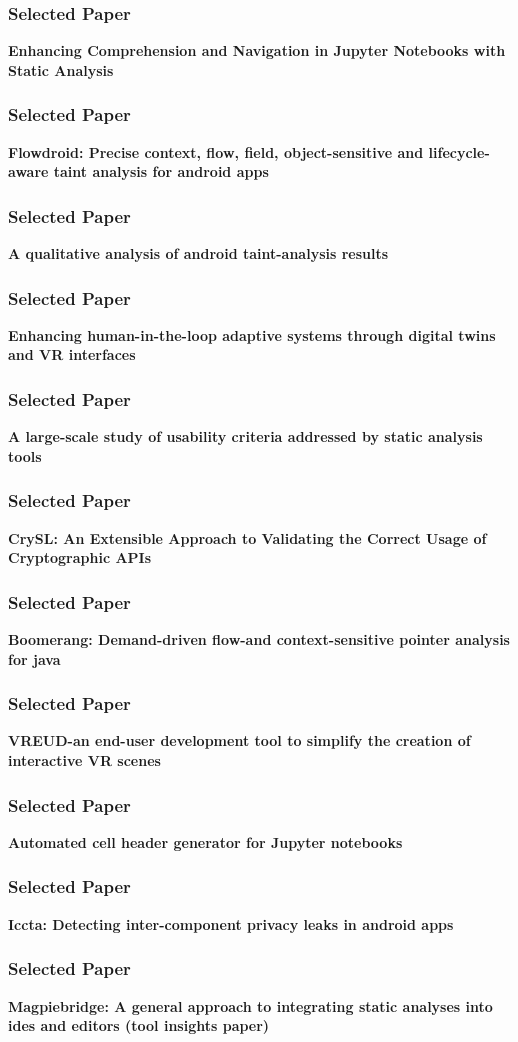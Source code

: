 \documentclass[handout]{beamer}
\begin{document}
\begin{frame}[plain]
\centering
\frametitle{Selected Paper}
\Large\textbf{Enhancing Comprehension and Navigation in Jupyter Notebooks with Static Analysis}
\end{frame}
\begin{frame}[plain]
\centering
\frametitle{Selected Paper}
\Large\textbf{Flowdroid: Precise context, flow, field, object-sensitive and lifecycle-aware taint analysis for android apps}
\end{frame}
\begin{frame}[plain]
\centering
\frametitle{Selected Paper}
\Large\textbf{A qualitative analysis of android taint-analysis results}
\end{frame}
\begin{frame}[plain]
\centering
\frametitle{Selected Paper}
\Large\textbf{Enhancing human-in-the-loop adaptive systems through digital twins and VR interfaces}
\end{frame}
\begin{frame}[plain]
\centering
\frametitle{Selected Paper}
\Large\textbf{A large-scale study of usability criteria addressed by static analysis tools}
\end{frame}
\begin{frame}[plain]
\centering
\frametitle{Selected Paper}
\Large\textbf{CrySL: An Extensible Approach to Validating the Correct Usage of Cryptographic APIs}
\end{frame}
\begin{frame}[plain]
\centering
\frametitle{Selected Paper}
\Large\textbf{Boomerang: Demand-driven flow-and context-sensitive pointer analysis for java}
\end{frame}
\begin{frame}[plain]
\centering
\frametitle{Selected Paper}
\Large\textbf{VREUD-an end-user development tool to simplify the creation of interactive VR scenes}
\end{frame}
\begin{frame}[plain]
\centering
\frametitle{Selected Paper}
\Large\textbf{Automated cell header generator for Jupyter notebooks}
\end{frame}
\begin{frame}[plain]
\centering
\frametitle{Selected Paper}
\Large\textbf{Iccta: Detecting inter-component privacy leaks in android apps}
\end{frame}
\begin{frame}[plain]
\centering
\frametitle{Selected Paper}
\Large\textbf{Magpiebridge: A general approach to integrating static analyses into ides and editors (tool insights paper)}
\end{frame}
\end{document}
